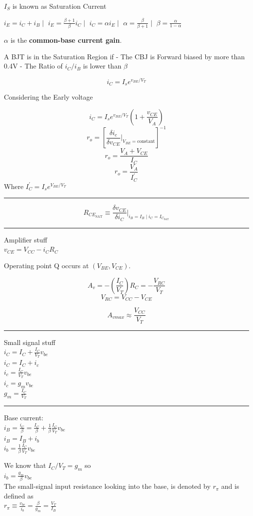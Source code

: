 \documentclass[a4paper]{article}
\newcommand{\hrl}{
    \vspace{2mm}
    \hrule
    \vspace{2mm}
}
\begin{document}
\begin{multicols}{3}
$I_S$ is known as Saturation Current

$i_E=i_C+i_B \mid$
$i_E=\frac{\beta+1}{\beta}i_C \mid$
$i_C=\alpha i_E \mid$
$\alpha=\frac{\beta}{\beta + 1} \mid$
$\beta=\frac{\alpha}{1-\alpha}$

$\alpha$ is the \textbf{common-base current gain}.

A BJT is in the Saturation Region if 
- The CBJ is Forward biased by more than 0.4V
- The Ratio of $i_C/i_B$ is lower than $\beta$



$$i_C=I_s e^{v_{BE}/V_T}$$


Considering the Early voltage

$$i_C=I_s e^{v_{BE}/V_T} \left(1 + \frac{v_{CE}}{V_A}\right)$$
$$r_o=\left[\frac{\delta i_c}{\delta v_{CE}}\Big|_{V_{BE} = \text{constant}}\right]^{-1}$$
$$r_o=\frac{V_A + V_{CE}}{I_C}$$
$$r_o=\frac{V_A}{I_C^{'}}$$
Where $I_C^{'}=I_s e^{V_{BE}/V_T}$

\hrl

$$ R_{CE_\text{SAT}} \equiv \frac{\delta v_{CE}}{\delta i_C} \Big|_{i_B = I_B \mid i_C=I_{C_\text{SAT}}}$$

\hrl

Amplifier stuff\\
$v_{CE}=V_{CC}-i_CR_C$

Operating point Q occurs at $(V_{BE}, V_{CE})$.

$$A_v=-\left(\frac{I_C}{V_T}\right)R_C=-\frac{V_{RC}}{V_T}$$
$$V_{RC}=V_{CC}-V_{CE}$$

$$A_{vmax}\approx \frac{V_{CC}}{V_T}$$

\hrl

Small signal stuff\\
$i_C=I_C+\frac{I_C}{V_T}v_{be}$\\
$i_C=I_C+i_c$\\
$i_c=\frac{I_C}{V_T}v_{be}$\\

$i_c=g_m v_{be}$\\

$g_m=\frac{I_C}{V_T}$

\hrl

Base current:\\
$i_B=\frac{i_C}{\beta}=\frac{I_C}{\beta}+\frac{1}{\beta}\frac{I_C}{V_T}v_{be}$\\
$i_B=I_B+i_b$\\
$i_b=\frac{1}{\beta}\frac{I_C}{V_T}v_{be}$

We know that $I_C/V_T=g_m$ so\\
$i_b=\frac{g_m}{\beta}v_{be}$\\
The small-signal input resistance looking into the base, is denoted by
$r_\pi$ and is defined as \\
$r_\pi\equiv\frac{v_{be}}{i_b}=\frac{\beta}{g_m}=\frac{V_T}{I_B}$\\


\end{multicols}
\end{document}
